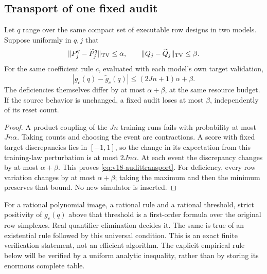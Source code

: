 \subsection{Transport of one fixed audit}
\begin{proposition}
\label{prop:v18-audittransport}
Let $q$ range over the same compact set of executable row designs in two
models. Suppose uniformly in $q,j$ that
\[
 \|P_j^q-\widetilde P_j^q\|_{\rm TV}\le\alpha,\qquad
 \|Q_j-\widetilde Q_j\|_{\rm TV}\le\beta.
\]
For the same coefficient rule $c$, evaluated with each model's own target
validation,
\begin{equation}\label{eq:v18-audittransport}
 |g_c(q)-\widetilde g_c(q)|\le(2Jn+1)\alpha+\beta.
\end{equation}
The deficiencies themselves differ by at most $\alpha+\beta$, at the
same resource budget. If the source behavior is unchanged, a fixed audit
loses at most $\beta$, independently of its reset count.
\end{proposition}
\begin{proof}
A product coupling of the $Jn$ training runs fails with probability at
most $Jn\alpha$. Taking counts and choosing the event are contractions.
A score with fixed target discrepancies lies in $[-1,1]$, so the change
in its expectation from this training-law perturbation is at most
$2Jn\alpha$. At each event the discrepancy changes by at most
$\alpha+\beta$. This proves \eqref{eq:v18-audittransport}. For deficiency,
every row variation changes by at most $\alpha+\beta$; taking the maximum
and then the minimum preserves that bound. No new simulator is inserted.
\end{proof}

For a rational polynomial image, a rational rule and a rational threshold,
strict positivity of $g_c(q)$ above that threshold is a first-order formula
over the original row simplexes. Real quantifier elimination decides it.
The same is true of an existential rule followed by this universal
condition. This is an exact finite verification statement, not an efficient
algorithm. The explicit empirical rule below will be verified by a uniform
analytic inequality, rather than by storing its enormous complete table.
